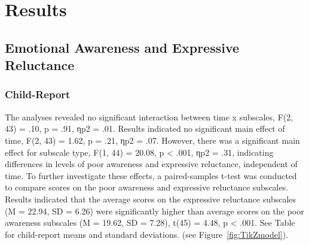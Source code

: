 \section{Results}
\subsection{Emotional Awareness and Expressive Reluctance}
\subsubsection{Child-Report } The analyses revealed no significant interaction between time x subscales, F(2, 43) = .10, p = .91, ηp2 = .01. Results indicated no significant main effect of time, F(2, 43) = 1.62, p = .21, ηp2 = .07. However, there was a significant main effect for subscale type, F(1, 44) = 20.08, p < .001, ηp2 = .31, indicating differences in levels of poor awareness and expressive reluctance, independent of time. 
To further investigate these effects, a paired-samples t-test was conducted to compare scores on the poor awareness and expressive reluctance subscales. Results indicated that the average scores on the expressive reluctance subscales (M = 22.94, SD = 6.26) were significantly higher than average scores on the poor awareness subscales (M = 19.62, SD = 7.28), t(45) = 4.48, p < .001. See Table  for child-report means and standard deviations. 
 (see Figure~\ref{fig:TikZmodel}).

